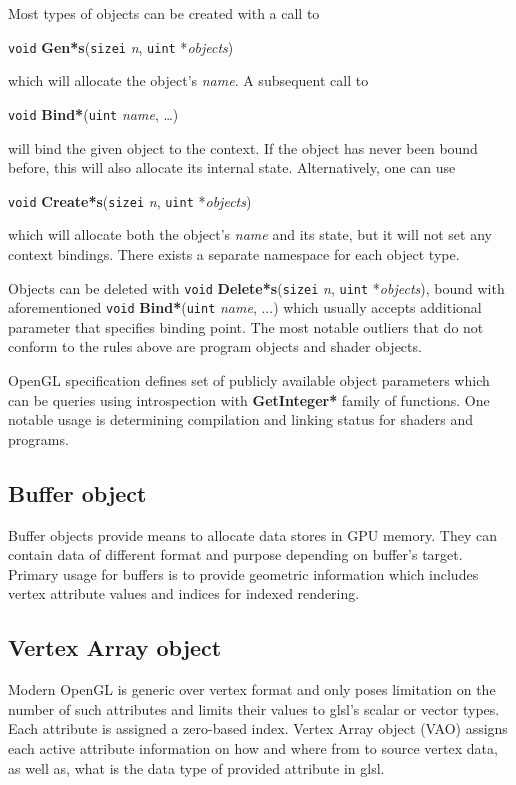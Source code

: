\noindent Most types of objects can be created with a call to
\begin{center}
    \texttt{void} \textbf{Gen*s}(\texttt{sizei} \textit{n}, \texttt{uint} *\textit{objects})
\end{center}
\noindent which will allocate the object's \textit{name}. A subsequent call to
\begin{center}
    \texttt{void} \textbf{Bind*}(\texttt{uint} \textit{name}, \ldots)
\end{center}
\noindent will bind the given object to the context. If the object has never been bound before, this will also allocate its internal state. Alternatively, one can use
\begin{center}
    \texttt{void} \textbf{Create*s}(\texttt{sizei} \textit{n}, \texttt{uint} *\textit{objects})
\end{center}
\noindent which will allocate both the object's \textit{name} and its state, but it will not set any context bindings. There exists a separate namespace for each object type.

Objects can be deleted with \texttt{void} \textbf{Delete*s}(\texttt{sizei} \textit{n}, \texttt{uint} *\textit{objects}), bound with aforementioned \texttt{void} \textbf{Bind*}(\texttt{uint} \textit{name}, ...) which usually accepts additional parameter that specifies binding point.
The most notable outliers that do not conform to the rules above are program objects and shader objects.

OpenGL specification defines set of publicly available object parameters which can be queries using introspection with \textbf{GetInteger*} family of functions. One notable usage is determining compilation and linking status for shaders and programs. 
\subsection{Buffer object}

Buffer objects provide means to allocate data stores in GPU memory. They can contain data of different format and purpose depending on buffer's target. Primary usage for buffers is to provide geometric information which includes vertex attribute values and indices for indexed rendering.

\subsection{Vertex Array object}

Modern OpenGL is generic over vertex format and only poses limitation on the number of such 
attributes and limits their values to glsl's scalar or vector types. 
Each attribute is assigned a zero-based index. Vertex Array object (VAO) assigns each active 
attribute information on how and where from to source vertex data, as well as, what is the
data type of provided attribute in glsl.

